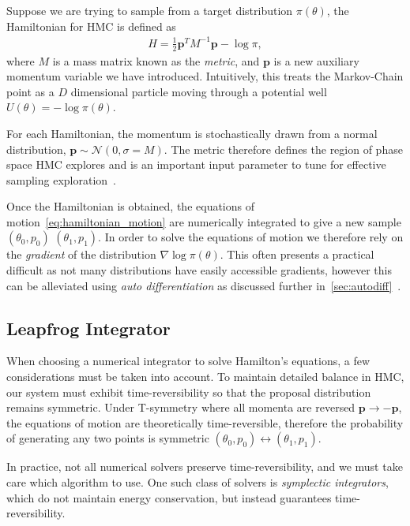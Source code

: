 \documentclass[11pt]{article}
\begin{document}
    Suppose we are trying to sample from a target distribution $\pi(\theta)$, the Hamiltonian for HMC is defined as
    \begin{equation}\label{eq:hmc_hamiltonian}
    \begin{aligned}
        H = \frac{1}{2} \mathbf{p}^T M^{-1} \mathbf{p} - \log \pi,
    \end{aligned}
    \end{equation}
    where $M$ is a mass matrix known as the \emph{metric}, and $\mathbf{p}$ is a new auxiliary momentum variable we have introduced.
    Intuitively, this treats the Markov-Chain point as a $D$ dimensional particle moving through a
    potential well $U(\theta) = -\log \pi(\theta)$.

    For each Hamiltonian, the momentum is stochastically drawn from a normal distribution,
    $\mathbf{p} \sim \mathcal{N}(0, \sigma = M)$.
    The metric therefore defines the region of phase space HMC explores and is an important input parameter to
    tune for effective sampling exploration~\cite{betancourt2016energymetric}.

    Once the Hamiltonian is obtained, the equations of motion~\eqref{eq:hamiltonian_motion} are numerically integrated
    to give a new sample $(\theta_0, p_0)$ \rightarrow $(\theta_1, p_1)$.
    In order to solve the equations of motion we therefore rely on the \emph{gradient} of the
    distribution $\nabla \log \pi(\theta)$.
    This often presents a practical difficult as not many distributions have easily accessible gradients, however this
    can be alleviated using \emph{auto differentiation} as discussed further in~\ref{sec:autodiff}~\cite{carpenter2015stan}.


\subsection{Leapfrog Integrator}\label{subsec:integrator}
    When choosing a numerical integrator to solve Hamilton's equations, a few considerations must be taken into account.
    To maintain detailed balance in HMC, our system must exhibit time-reversibility so that the proposal distribution
    remains symmetric.
    Under T-symmetry where all momenta are reversed $\mathbf{p} \rightarrow -\mathbf{p}$, the equations of motion are
    theoretically time-reversible, therefore the probability of generating any two points is
    symmetric $(\theta_0, p_0) \leftrightarrow (\theta_1, p_1)$.

    In practice, not all numerical solvers preserve time-reversibility, and we must take care which algorithm to use.
    One such class of solvers is \emph{symplectic integrators}, which do not
    maintain energy conservation, but instead guarantees time-reversibility.
\end{document}
